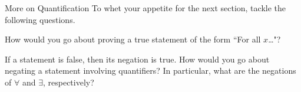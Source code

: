 \begin{section}{More on Quantification}
To whet your appetite for the next section, tackle the following questions.

\begin{question}
How would you go about proving a true statement of the form ``For all $x$\ldots"?
\end{question}

\begin{question}
If a statement is false, then its negation is true.  How would you go about negating a statement involving quantifiers?  In particular, what are the negations of $\forall$ and $\exists$, respectively?
\end{question}

\end{section}
